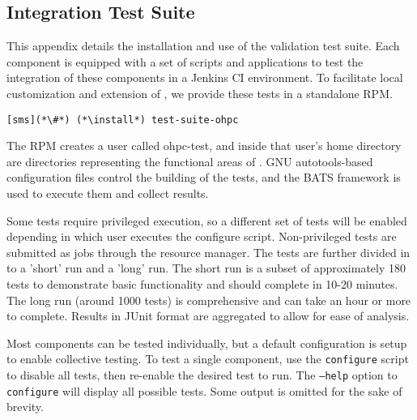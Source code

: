 \subsection{Integration Test Suite}  \label{appendix:test_suite}

This appendix details the installation and use of the \OHPC{} validation test
suite. Each \OHPC{} component is equipped with a set of scripts and applications
to test the integration of these components in a Jenkins CI 
environment. To facilitate local customization and extension of \OHPC{}, we 
provide these tests in a standalone RPM. 

\begin{lstlisting}
[sms](*\#*) (*\install*) test-suite-ohpc
\end{lstlisting}

The RPM creates a user called ohpc-test, and inside that user's home directory 
are directories representing the functional areas of \OHPC{}. GNU 
autotools-based configuration files control the building of the tests, and the
BATS framework is used to execute them and collect results. 

Some tests require privileged execution, so a different set of tests will be
enabled depending in which user executes the configure script. Non-privileged
tests are submitted as jobs through the \rms{} resource manager. The tests are
further divided in to a 'short' run and a 'long' run. The short run is a subset
of approximately 180 tests to demonstrate basic functionality and should 
complete in 10-20 minutes. The long run (around 1000 tests) is comprehensive 
and can take an hour or more to complete.  Results in JUnit format are 
aggregated to allow for ease of analysis.

Most components can be tested individually, but a default configuration is setup 
to enable collective testing. To test a single component, use the \texttt{configure}
script to disable all tests, then re-enable the desired test to run. The
\texttt{--help} option to \texttt{configure} will display all possible tests. Some 
output is omitted for the sake of brevity.

